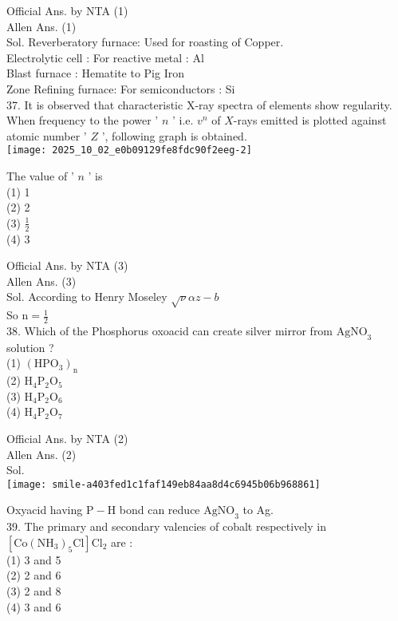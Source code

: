 \documentclass[10pt]{article}
\begin{document}
Official Ans. by NTA (1)\\
Allen Ans. (1)\\
Sol. Reverberatory furnace: Used for roasting of Copper.\\
Electrolytic cell : For reactive metal : Al\\
Blast furnace : Hematite to Pig Iron\\
Zone Refining furnace: For semiconductors : Si\\
37. It is observed that characteristic X-ray spectra of elements show regularity. When frequency to the power ' \(n\) ' i.e. \(v^{n}\) of \(X\)-rays emitted is plotted against atomic number ' \(Z\) ', following graph is obtained.\\
\texttt{[image: 2025\_10\_02\_e0b09129fe8fdc90f2eeg-2]}

The value of ' \(n\) ' is\\
(1) 1\\
(2) 2\\
(3) \(\frac{1}{2}\)\\
(4) 3

Official Ans. by NTA (3)\\
Allen Ans. (3)\\
Sol. According to Henry Moseley \(\sqrt{\nu} \alpha z-b\)\\
So \(\mathrm{n}=\frac{1}{2}\)\\
38. Which of the Phosphorus oxoacid can create silver mirror from \(\mathrm{AgNO}_{3}\) solution ?\\
(1) \(\left(\mathrm{HPO}_{3}\right)_{\mathrm{n}}\)\\
(2) \(\mathrm{H}_{4} \mathrm{P}_{2} \mathrm{O}_{5}\)\\
(3) \(\mathrm{H}_{4} \mathrm{P}_{2} \mathrm{O}_{6}\)\\
(4) \(\mathrm{H}_{4} \mathrm{P}_{2} \mathrm{O}_{7}\)

Official Ans. by NTA (2)\\
Allen Ans. (2)\\
Sol.\\
\texttt{[image: smile-a403fed1c1faf149eb84aa8d4c6945b06b968861]}

Oxyacid having \(\mathrm{P}-\mathrm{H}\) bond can reduce \(\mathrm{AgNO}_{3}\) to Ag.\\
39. The primary and secondary valencies of cobalt respectively in \(\left[\mathrm{Co}\left(\mathrm{NH}_{3}\right)_{5} \mathrm{Cl}\right] \mathrm{Cl}_{2}\) are :\\
(1) 3 and 5\\
(2) 2 and 6\\
(3) 2 and 8\\
(4) 3 and 6
\end{document}
